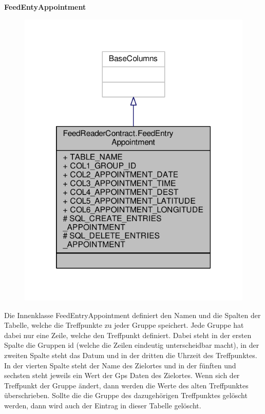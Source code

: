 \textbf{FeedEntyAppointment}
\begin{figure}[H]
	\includegraphics[scale = 1]{res/umlClasses/feed_reader_contract_appointment.pdf}
	\centering
\end{figure}
Die Innenklasse FeedEntryAppointment definiert den Namen und die Spalten der Tabelle, welche die Treffpunkte zu jeder Gruppe speichert. Jede Gruppe hat dabei nur eine Zeile, welche den Treffpunkt definiert. 
Dabei steht in der ersten Spalte die Gruppen id (welche die Zeilen eindeutig unterscheidbar macht), in der zweiten Spalte steht das Datum und in der dritten die Uhrzeit des Treffpunktes. In der vierten Spalte steht der Name des Zielortes und in der fünften und sechsten steht jeweils ein Wert der Gps Daten des Zielortes. 
Wenn sich der Treffpunkt der Gruppe ändert, dann werden die Werte des alten Treffpunktes überschrieben.
Sollte die die Gruppe des dazugehörigen Treffpunktes gelöscht werden, dann wird auch der Eintrag in dieser Tabelle gelöscht.

